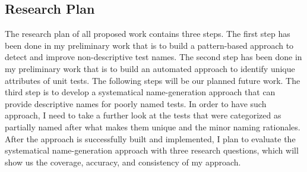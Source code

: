 \subsection{Research Plan}

The research plan of all proposed work contains three steps.
%
The first step has been done in my preliminary work that is to build a pattern-based approach to detect and improve non-descriptive test names.
%
The second step has been done in my preliminary work that is to build an automated approach to identify unique attributes of unit tests.
%
The following steps will be our planned future work.
%
The third step is to develop a systematical name-generation approach that can provide descriptive names for poorly named tests.
%
In order to have such approach, I need to take a further look at the tests that were categorized as partially named after what makes them unique and the minor naming rationales.
%
After the approach is successfully built and implemented, I plan to evaluate the systematical name-generation approach with three research questions, which will show us the coverage, accuracy, and consistency of my approach.